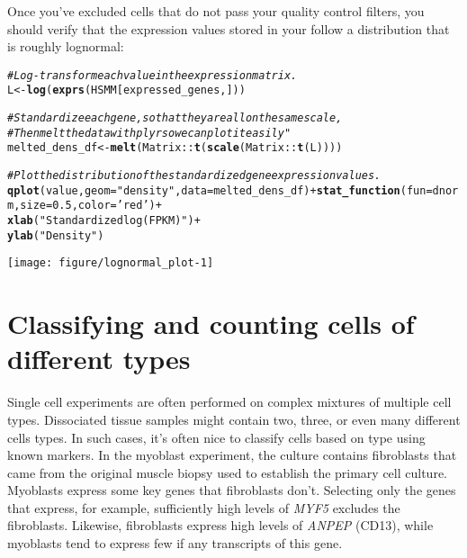 \documentclass[10pt,oneside]{article}\usepackage[]{graphicx}\usepackage[]{color}
\makeatletter
\def\maxwidth{ %
  \ifdim\Gin@nat@width>\linewidth
    \linewidth
  \else
    \Gin@nat@width
  \fi
}
\newcommand{\hlnum}[1]{\textcolor[rgb]{0.686,0.059,0.569}{#1}}%
\newcommand{\hlstr}[1]{\textcolor[rgb]{0.192,0.494,0.8}{#1}}%
\newcommand{\hlcom}[1]{\textcolor[rgb]{0.678,0.584,0.686}{\textit{#1}}}%
\newcommand{\hlopt}[1]{\textcolor[rgb]{0,0,0}{#1}}%
\newcommand{\hlstd}[1]{\textcolor[rgb]{0.345,0.345,0.345}{#1}}%
\newcommand{\hlkwb}[1]{\textcolor[rgb]{0.69,0.353,0.396}{#1}}%
\newcommand{\hlkwc}[1]{\textcolor[rgb]{0.333,0.667,0.333}{#1}}%
\newcommand{\hlkwd}[1]{\textcolor[rgb]{0.737,0.353,0.396}{\textbf{#1}}}%
\newenvironment{kframe}{%
 \def\at@end@of@kframe{}%
 \ifinner\ifhmode%
  \def\at@end@of@kframe{\end{minipage}}%
  \begin{minipage}{\columnwidth}%
 \fi\fi%
 \def\FrameCommand##1{\hskip\@totalleftmargin \hskip-\fboxsep
 \colorbox{shadecolor}{##1}\hskip-\fboxsep
     \hskip-\linewidth \hskip-\@totalleftmargin \hskip\columnwidth}%
 \MakeFramed {\advance\hsize-\width
   \@totalleftmargin\z@ \linewidth\hsize
   \@setminipage}}%
 {\par\unskip\endMakeFramed%
 \at@end@of@kframe}
\newenvironment{knitrout}{}{} %
\makeatother
\begin{document}
 Once you've excluded cells that do not pass your quality control filters, you should verify that the expression values stored in your  follow a distribution that is roughly lognormal:  
\begin{knitrout}
\color{fgcolor}\begin{kframe}
\begin{alltt}
\hlcom{# Log-transform each value in the expression matrix.}
\hlstd{L} \hlkwb{<-} \hlkwd{log}\hlstd{(}\hlkwd{exprs}\hlstd{(HSMM[expressed_genes,]))}

\hlcom{# Standardize each gene, so that they are all on the same scale,}
\hlcom{# Then melt the data with plyr so we can plot it easily"}
\hlstd{melted_dens_df} \hlkwb{<-} \hlkwd{melt}\hlstd{(Matrix}\hlopt{::}\hlkwd{t}\hlstd{(}\hlkwd{scale}\hlstd{(Matrix}\hlopt{::}\hlkwd{t}\hlstd{(L))))}

\hlcom{# Plot the distribution of the standardized gene expression values.}
\hlkwd{qplot}\hlstd{(value,} \hlkwc{geom}\hlstd{=}\hlstr{"density"}\hlstd{,} \hlkwc{data}\hlstd{=melted_dens_df)} \hlopt{+}  \hlkwd{stat_function}\hlstd{(}\hlkwc{fun} \hlstd{= dnorm,} \hlkwc{size}\hlstd{=}\hlnum{0.5}\hlstd{,} \hlkwc{color}\hlstd{=}\hlstr{'red'}\hlstd{)} \hlopt{+}
  \hlkwd{xlab}\hlstd{(}\hlstr{"Standardized log(FPKM)"}\hlstd{)} \hlopt{+}
  \hlkwd{ylab}\hlstd{(}\hlstr{"Density"}\hlstd{)}
\end{alltt}
\end{kframe}

{\centering \texttt{[image: figure/lognormal\_plot-1]} 

}



\end{knitrout}
 
 \section{Classifying and counting cells of different types}
 
 Single cell experiments are often performed on complex mixtures of multiple cell types. Dissociated tissue samples might contain two, three, or even many different cells types. In such cases, it's often nice to classify cells based on type using known markers. In the myoblast experiment, the culture contains fibroblasts that came from the original muscle biopsy used to establish the primary cell culture.  Myoblasts express some key genes that fibroblasts don't. Selecting only the genes that express, for example, sufficiently high levels of \emph{MYF5} excludes the fibroblasts. Likewise, fibroblasts express high levels of \emph{ANPEP} (CD13), while myoblasts tend to express few if any transcripts of this gene. 
 
\end{document}
